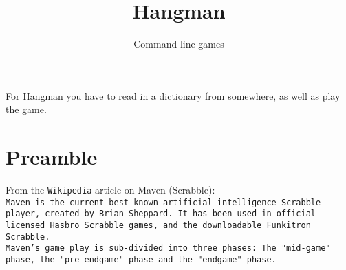 \documentclass{42-en}
\begin{document}
\title{Hangman}
\subtitle{Command line games}


\summary
{
For Hangman you have to read in a dictionary from somewhere, as well as play the game.
}

\maketitle

\tableofcontents



\chapter{Preamble}

From the \texttt{Wikipedia} article on Maven (Scrabble):\\

\texttt{Maven is the current best known artificial intelligence Scrabble player, created by Brian Sheppard. It has been used in official licensed Hasbro Scrabble games, and the downloadable Funkitron Scrabble.}\\

\texttt{Maven's game play is sub-divided into three phases: The "mid-game" phase, the "pre-endgame" phase and the "endgame" phase.}\\
\end{document}
